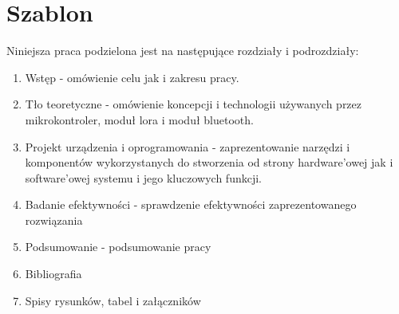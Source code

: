 \section{Szablon}
Niniejsza praca podzielona jest na następujące rozdziały i podrozdziały:
\begin{enumerate}
	\item Wstęp - omówienie celu jak i zakresu pracy.
	\item Tło teoretyczne - omówienie koncepcji i technologii używanych przez mikrokontroler, moduł lora i moduł bluetooth.
	\item Projekt urządzenia i oprogramowania - zaprezentowanie narzędzi i komponentów wykorzystanych do stworzenia od strony hardware'owej jak i software'owej systemu i jego kluczowych funkcji.
	\item Badanie efektywności - sprawdzenie efektywności zaprezentowanego rozwiązania
	\item Podsumowanie - podsumowanie pracy
	\item Bibliografia
	\item Spisy rysunków, tabel i załączników
\end{enumerate}